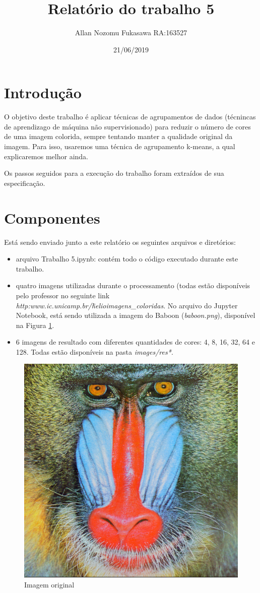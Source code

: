 \documentclass{article}
\title{Relatório do trabalho 5}
\date{21/06/2019}
\author{Allan Nozomu Fukasawa RA:163527}
\begin{document}
\maketitle

\section{Introdução}

O objetivo deste trabalho é aplicar técnicas de agrupamentos de dados (técnincas de aprendizago de máquina não supervisionado) para reduzir o número de cores de uma imagem colorida, sempre tentando manter a qualidade original da imagem. Para isso, usaremos uma técnica de agrupamento k-means, a qual explicaremos melhor ainda.

Os passos seguidos para a execução do trabalho foram extraídos de sua especificação. \cite{Helio:1}

\section{Componentes}

Está sendo enviado junto a este relatório os seguintes arquivos e diretórios:

\begin{itemize}
  \item arquivo Trabalho 5.ipynb: contém todo o código executado durante este trabalho.

  \item quatro imagens utilizadas durante o processamento (todas estão disponíveis pelo professor no seguinte link \textit{http:\/\/www.ic.unicamp.br/\~helio\/imagens\_coloridas\/}. No arquivo do Jupyter Notebook, está sendo utilizada a imagem do Baboon (\textit{baboon.png}), disponível na Figura \ref{Fig:original}.

  \item 6 imagens de resultado com diferentes quantidades de cores: 4, 8, 16, 32, 64 e 128. Todas estão disponíveis na pasta \textit{images/res*}.

\end{itemize}

\begin{figure}[!htb]
  \centering
  \includegraphics[width=.5\linewidth]{images/baboon.png}
  \caption{Imagem original}\label{Fig:original}
\end{figure}
\end{document}
